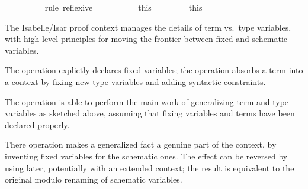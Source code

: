 \begin{isabellebody}
\isanewline
\ \ \ \ \ \ \ \ \isamarkupfalse%
\ {}rule\ reflexive{}\isanewline
\ \ \ \ \isamarkupfalse%
%
\endisatagproof
{\isafoldproof}%
%
\isadelimproof
\isanewline
%
\endisadelimproof
\ \ \ \ \isamarkupfalse%
\ this\ \ %
\isanewline
%
\isadelimproof
\ \ %
\endisadelimproof
%
\isatagproof
{}\isamarkupfalse%
%
\endisatagproof
{\isafoldproof}%
%
\isadelimproof
\isanewline
%
\endisadelimproof
\ \ \isamarkupfalse%
\ this\ \ %
\isanewline
{}\isamarkupfalse%
%
\begin{isamarkuptext}%
The Isabelle/Isar proof context manages the details of term
  vs.\ type variables, with high-level principles for moving the
  frontier between fixed and schematic variables.

  The  operation explictly declares fixed
  variables; the  operation absorbs a term into
  a context by fixing new type variables and adding syntactic
  constraints.

  The  operation is able to perform the main work of
  generalizing term and type variables as sketched above, assuming
  that fixing variables and terms have been declared properly.

  There  operation makes a generalized fact a genuine
  part of the context, by inventing fixed variables for the schematic
  ones.  The effect can be reversed by using  later,
  potentially with an extended context; the result is equivalent to
  the original modulo renaming of schematic variables.


\end{isamarkuptext}
\end{isabellebody}
